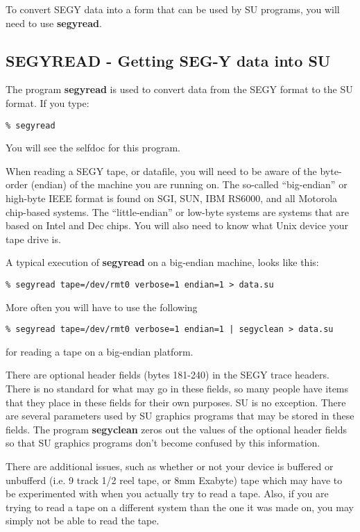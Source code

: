 {{{To convert SEGY data into a form that can be used by SU programs,
you will need to use {\bf segyread}.


\subsection{SEGYREAD - Getting SEG-Y data into SU}
The program {\bf segyread\/} is used to convert data from the SEGY format
to the SU format.
If you type:
{\small\begin{verbatim}
% segyread
\end{verbatim} }  \noindent
You will see the selfdoc for this program.

When reading a SEGY tape, or datafile, you will need to be aware of
the byte-order (endian) of the machine you are running on.
The so-called ``big-endian'' or high-byte IEEE format is found on SGI,
SUN, IBM RS6000, and all Motorola chip-based systems. 
The ``little-endian'' or low-byte systems are systems that are based
on Intel and Dec chips.
You will also need to know what Unix device your tape drive is.

A typical execution of {\bf segyread\/} on a big-endian machine, 
looks like this:
{\small\begin{verbatim}
% segyread tape=/dev/rmt0 verbose=1 endian=1 > data.su
\end{verbatim}}\noindent

More often you will have to use the following
{\small\begin{verbatim}
% segyread tape=/dev/rmt0 verbose=1 endian=1 | segyclean > data.su
\end{verbatim}}\noindent
for reading a tape on a big-endian platform.

There are optional header fields (bytes 181-240) in the SEGY trace
headers. There is no standard for what may go in these fields, so
many people have items that they place in these fields for their
own purposes. SU is no exception. There are several parameters 
used by SU graphics programs that may be stored in these fields.
The program {\bf segyclean\/} zeros out the values of the optional header 
fields so that SU graphics programs don't become confused by this information.

There are additional issues, such as whether or not your device
is buffered or unbufferd (i.e. 9 track 1/2 reel tape, or 8mm Exabyte)
tape which may have to be experimented with when you actually
try to read a tape.
Also, if you are trying to read a tape on a different system than
the one it was made on, you may simply not be able to read the tape.

}}}
